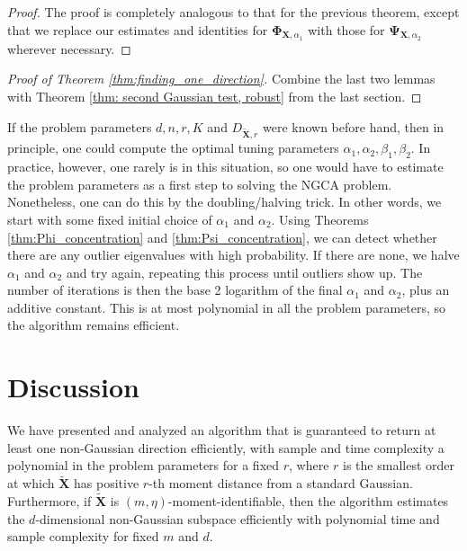 \documentclass[final,12pt]{colt2018} %
\numberwithin{equation}{section}
\newcommand{\boldPhi}{\boldsymbol{\Phi}}
\newcommand{\boldPsi}{\boldsymbol{\Psi}}
\newcommand{\boldX}{\textbf{X}}
\begin{document}
\begin{proof}
	The proof is completely analogous to that for the previous theorem, except that we replace our estimates and identities for $\boldPhi_{\boldX,\alpha_1}$ with those for $\boldPsi_{\boldX,\alpha_2}$ wherever necessary.
\end{proof}

\begin{proof}[Proof of Theorem \ref{thm:finding_one_direction}]
	Combine the last two lemmas with Theorem \ref{thm: second Gaussian test, robust} from the last section.
\end{proof}

\begin{remark}
	If the problem parameters $d, n, r, K$ and $D_{\tilde{\boldX},r}$ were known before hand, then in principle, one could compute the optimal tuning parameters $\alpha_1,\alpha_2,\beta_1,\beta_2$. In practice, however, one rarely is in this situation, so one would have to estimate the problem parameters as a first step to solving the NGCA problem. Nonetheless, one can do this by the doubling/halving trick. In other words, we start with some fixed initial choice of $\alpha_1$ and $\alpha_2$. Using Theorems \ref{thm:Phi_concentration} and \ref{thm:Psi_concentration}, we can detect whether there are any outlier eigenvalues with high probability. If there are none, we halve $\alpha_1$ and $\alpha_2$ and try again, repeating this process until outliers show up. The number of iterations is then the base 2 logarithm of the final $\alpha_1$ and $\alpha_2$, plus an additive constant. This is at most polynomial in all the problem parameters, so the algorithm remains efficient.
\end{remark}

\section{Discussion} \label{discussion}

We have presented and analyzed an algorithm that is guaranteed to return at least one non-Gaussian direction efficiently, with sample and time complexity a polynomial in the problem parameters for a fixed $r$, where $r$ is the smallest order at which $\tilde{\boldX}$ has positive $r$-th moment distance from a standard Gaussian. Furthermore, if $\tilde{\boldX}$ is $(m,\eta)$-moment-identifiable, then the algorithm estimates the $d$-dimensional non-Gaussian subspace efficiently with polynomial time and sample complexity for fixed $m$ and $d$.
\end{document}
